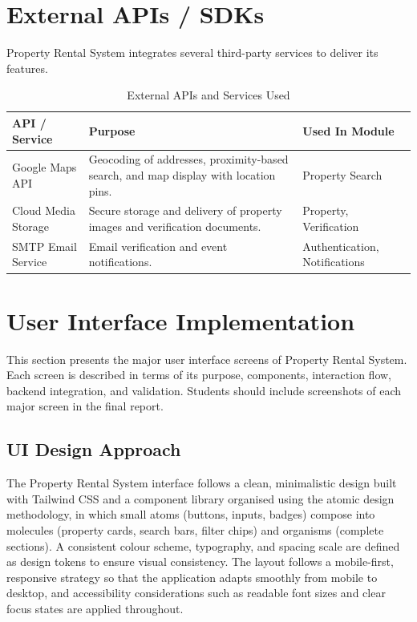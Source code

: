 
\section{External APIs / SDKs}

Property Rental System integrates several third-party services to deliver its features.

\begin{table}[h]
\centering
\caption{External APIs and Services Used}
\begin{tabularx}{\textwidth}{|>{\raggedright\arraybackslash}p{3.2cm}|X|>{\raggedright\arraybackslash}p{3.5cm}|}
\hline
\textbf{API / Service} & \textbf{Purpose} & \textbf{Used In Module} \\
\hline
Google Maps API & Geocoding of addresses, proximity-based search, and map display with location pins. & Property Search \\
\hline
Cloud Media Storage & Secure storage and delivery of property images and verification documents. & Property, Verification \\
\hline
SMTP Email Service & Email verification and event notifications. & Authentication, Notifications \\
\hline
\end{tabularx}
\end{table}


\section{User Interface Implementation}

This section presents the major user interface screens of Property Rental System. Each screen is described in terms of its purpose, components, interaction flow, backend integration, and validation. Students should include screenshots of each major screen in the final report.

\subsection{UI Design Approach}

The Property Rental System interface follows a clean, minimalistic design built with Tailwind CSS and a component library organised using the atomic design methodology, in which small atoms (buttons, inputs, badges) compose into molecules (property cards, search bars, filter chips) and organisms (complete sections). A consistent colour scheme, typography, and spacing scale are defined as design tokens to ensure visual consistency. The layout follows a mobile-first, responsive strategy so that the application adapts smoothly from mobile to desktop, and accessibility considerations such as readable font sizes and clear focus states are applied throughout.

